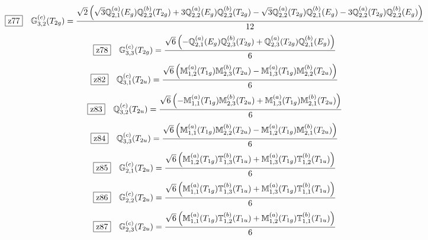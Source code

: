 \documentclass[fleqn,10pt,landscape]{jsarticle}
\begin{document}
\begin{dmath*}
\hspace*{3mm}\fbox{z77}\quad \mathbb{G}_{3,2}^{(c)}(T_{2g})=\frac{\sqrt{2} \left(\sqrt{3} \mathbb{Q}_{2,1}^{(a)}(E_{g}) \mathbb{Q}_{2,2}^{(b)}(T_{2g}) + 3 \mathbb{Q}_{2,2}^{(a)}(E_{g}) \mathbb{Q}_{2,2}^{(b)}(T_{2g}) - \sqrt{3} \mathbb{Q}_{2,2}^{(a)}(T_{2g}) \mathbb{Q}_{2,1}^{(b)}(E_{g}) - 3 \mathbb{Q}_{2,2}^{(a)}(T_{2g}) \mathbb{Q}_{2,2}^{(b)}(E_{g})\right)}{12}
\end{dmath*}
\begin{dmath*}
\hspace*{3mm}\fbox{z78}\quad \mathbb{G}_{3,3}^{(c)}(T_{2g})=\frac{\sqrt{6} \left(- \mathbb{Q}_{2,1}^{(a)}(E_{g}) \mathbb{Q}_{2,3}^{(b)}(T_{2g}) + \mathbb{Q}_{2,3}^{(a)}(T_{2g}) \mathbb{Q}_{2,1}^{(b)}(E_{g})\right)}{6}
\end{dmath*}
\begin{dmath*}
\hspace*{3mm}\fbox{z82}\quad \mathbb{Q}_{3,1}^{(c)}(T_{2u})=\frac{\sqrt{6} \left(\mathbb{M}_{1,2}^{(a)}(T_{1g}) \mathbb{M}_{2,3}^{(b)}(T_{2u}) - \mathbb{M}_{1,3}^{(a)}(T_{1g}) \mathbb{M}_{2,2}^{(b)}(T_{2u})\right)}{6}
\end{dmath*}
\begin{dmath*}
\hspace*{3mm}\fbox{z83}\quad \mathbb{Q}_{3,2}^{(c)}(T_{2u})=\frac{\sqrt{6} \left(- \mathbb{M}_{1,1}^{(a)}(T_{1g}) \mathbb{M}_{2,3}^{(b)}(T_{2u}) + \mathbb{M}_{1,3}^{(a)}(T_{1g}) \mathbb{M}_{2,1}^{(b)}(T_{2u})\right)}{6}
\end{dmath*}
\begin{dmath*}
\hspace*{3mm}\fbox{z84}\quad \mathbb{Q}_{3,3}^{(c)}(T_{2u})=\frac{\sqrt{6} \left(\mathbb{M}_{1,1}^{(a)}(T_{1g}) \mathbb{M}_{2,2}^{(b)}(T_{2u}) - \mathbb{M}_{1,2}^{(a)}(T_{1g}) \mathbb{M}_{2,1}^{(b)}(T_{2u})\right)}{6}
\end{dmath*}
\begin{dmath*}
\hspace*{3mm}\fbox{z85}\quad \mathbb{G}_{2,1}^{(c)}(T_{2u})=\frac{\sqrt{6} \left(\mathbb{M}_{1,2}^{(a)}(T_{1g}) \mathbb{T}_{1,3}^{(b)}(T_{1u}) + \mathbb{M}_{1,3}^{(a)}(T_{1g}) \mathbb{T}_{1,2}^{(b)}(T_{1u})\right)}{6}
\end{dmath*}
\begin{dmath*}
\hspace*{3mm}\fbox{z86}\quad \mathbb{G}_{2,2}^{(c)}(T_{2u})=\frac{\sqrt{6} \left(\mathbb{M}_{1,1}^{(a)}(T_{1g}) \mathbb{T}_{1,3}^{(b)}(T_{1u}) + \mathbb{M}_{1,3}^{(a)}(T_{1g}) \mathbb{T}_{1,1}^{(b)}(T_{1u})\right)}{6}
\end{dmath*}
\begin{dmath*}
\hspace*{3mm}\fbox{z87}\quad \mathbb{G}_{2,3}^{(c)}(T_{2u})=\frac{\sqrt{6} \left(\mathbb{M}_{1,1}^{(a)}(T_{1g}) \mathbb{T}_{1,2}^{(b)}(T_{1u}) + \mathbb{M}_{1,2}^{(a)}(T_{1g}) \mathbb{T}_{1,1}^{(b)}(T_{1u})\right)}{6}
\end{dmath*}
\vspace{5mm}
\end{document}
